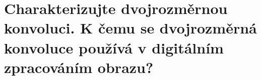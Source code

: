 \section{Charakterizujte dvojrozměrnou konvoluci. K čemu se dvojrozměrná konvoluce používá v digitálním zpracováním 
obrazu?}